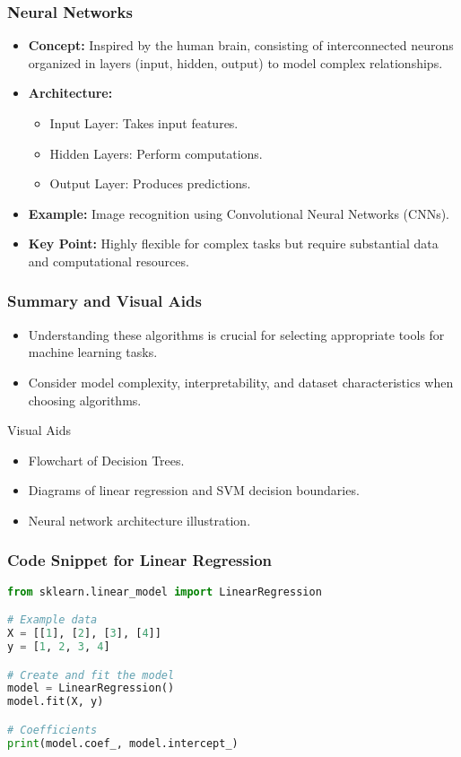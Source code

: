 \documentclass[aspectratio=169]{beamer}
\begin{document}
\begin{frame}[fragile]
    \frametitle{Neural Networks}
    \begin{itemize}
        \item \textbf{Concept:} Inspired by the human brain, consisting of interconnected neurons organized in layers (input, hidden, output) to model complex relationships.
        \item \textbf{Architecture:}
        \begin{itemize}
            \item Input Layer: Takes input features.
            \item Hidden Layers: Perform computations.
            \item Output Layer: Produces predictions.
        \end{itemize}
        \item \textbf{Example:} Image recognition using Convolutional Neural Networks (CNNs).
        \item \textbf{Key Point:} Highly flexible for complex tasks but require substantial data and computational resources.
    \end{itemize}
\end{frame}

\begin{frame}[fragile]
    \frametitle{Summary and Visual Aids}
    \begin{itemize}
        \item Understanding these algorithms is crucial for selecting appropriate tools for machine learning tasks.
        \item Consider model complexity, interpretability, and dataset characteristics when choosing algorithms.
    \end{itemize}
    \begin{block}{Visual Aids}
        \begin{itemize}
            \item Flowchart of Decision Trees.
            \item Diagrams of linear regression and SVM decision boundaries.
            \item Neural network architecture illustration.
        \end{itemize}
    \end{block}
\end{frame}

\begin{frame}[fragile]
    \frametitle{Code Snippet for Linear Regression}
    \begin{lstlisting}[language=Python]
from sklearn.linear_model import LinearRegression

# Example data
X = [[1], [2], [3], [4]]
y = [1, 2, 3, 4]

# Create and fit the model
model = LinearRegression()
model.fit(X, y)

# Coefficients
print(model.coef_, model.intercept_)
    \end{lstlisting}
\end{frame}
\end{document}
